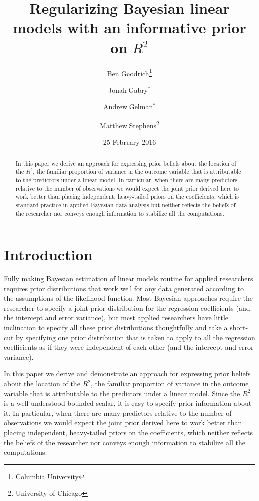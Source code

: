 \documentclass[11pt]{article}
\title{\bf Regularizing Bayesian linear models with an informative prior on $R^2$\vspace{.1in}}
\author{Ben Goodrich\footnote{Columbia University} \and Jonah Gabry$^{\ast}$
\and Andrew Gelman$^{\ast}$ \and Matthew Stephens\footnote{University of Chicago}\vspace{.1in}}
\date{25 February 2016\vspace{-.2in}}
\begin{document}
\maketitle
\thispagestyle{empty}

\begin{abstract}
\noindent In this paper we derive an approach for expressing prior beliefs about
the location of the $R^2$, the familiar proportion of variance in the outcome
variable that is attributable to the predictors under a linear model. In
particular, when there are many predictors relative to the number of
observations we would expect the joint prior derived here to work better than
placing independent, heavy-tailed priors on the coefficients, which is  standard
practice in applied Bayesian data analysis but  neither reflects the beliefs of
the researcher nor conveys enough information to stabilize all the computations.
\end{abstract}

\section{Introduction}

Fully making Bayesian estimation of linear models routine for applied
researchers requires prior distributions that work well for any data generated
according to the assumptions of the likelihood function. Most Bayesian
approaches require the researcher to specify a joint prior distribution for the
regression coefficients (and the intercept and error variance), but most applied
researchers have little inclination to specify all these prior distributions
thoughtfully and take a short-cut by specifying one prior distribution that is
taken to apply to all the regression coefficients as if they were independent of
each other (and the intercept and error variance).

In this paper we derive and demonstrate an approach for expressing  prior
beliefs about the location of the $R^2$, the familiar proportion of variance in
the outcome variable that is attributable to the predictors under a linear
model. Since the $R^2$ is a well-understood bounded scalar, it is easy to
specify prior information about it. In particular, when there are many
predictors relative to the number of observations we would expect the joint
prior derived here to work better than placing independent, heavy-tailed priors
on the coefficients, which neither reflects the beliefs of the researcher nor
conveys enough information to stabilize all the computations.
\end{document}
